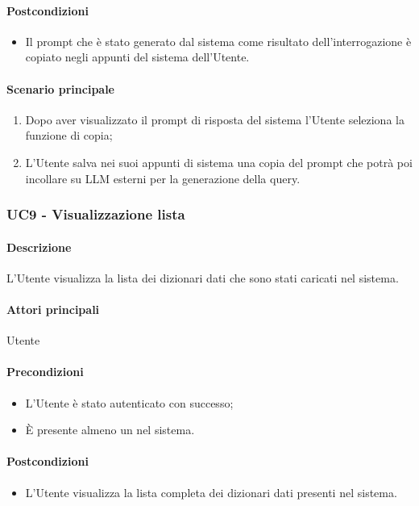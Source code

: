 \paragraph*{Postcondizioni}
\begin{itemize}
  \item Il prompt che è stato generato dal sistema come risultato dell’interrogazione è copiato negli appunti del sistema dell’Utente.
\end{itemize}

\paragraph*{Scenario principale}
\begin{enumerate}
  \item Dopo aver visualizzato il prompt di risposta del sistema l’Utente seleziona la funzione di copia;
  \item L’Utente salva nei suoi appunti di sistema una copia del prompt che potrà poi incollare su LLM esterni per la generazione della query.
\end{enumerate}


\subsubsection{UC9 - Visualizzazione lista }\label{UC9}
\paragraph*{Descrizione}
L’Utente visualizza la lista dei dizionari dati che sono stati caricati nel sistema.

\paragraph*{Attori principali} Utente

\paragraph*{Precondizioni}
\begin{itemize}
  \item L’Utente è stato autenticato con successo;
  \item È presente almeno un  nel sistema.  
\end{itemize}

\paragraph*{Postcondizioni}
\begin{itemize}
  \item L’Utente visualizza la lista completa dei dizionari dati presenti nel sistema.
\end{itemize}

